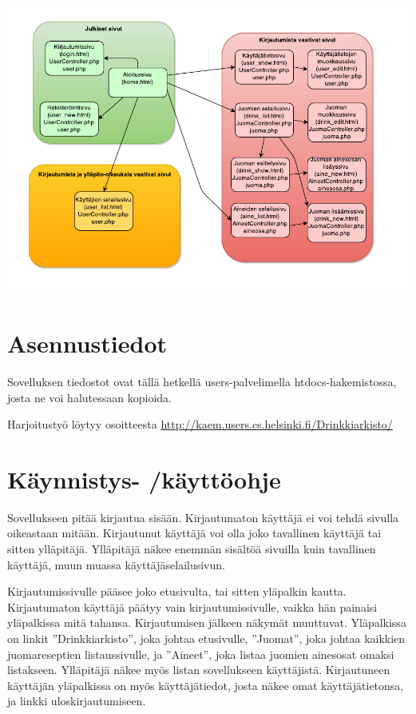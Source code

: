 \documentclass[a4paper]{article}
\begin{document}
\includegraphics[scale=0.8]{sivunakymat.pdf}

\section{Asennustiedot}

Sovelluksen tiedostot ovat tällä hetkellä users-palvelimella htdocs-hakemistossa, josta ne voi halutessaan kopioida.

Harjoitustyö löytyy osoitteesta \url{http://kaem.users.cs.helsinki.fi/Drinkkiarkisto/}


\section{Käynnistys- /käyttöohje}

Sovellukseen pitää kirjautua sisään. Kirjautumaton käyttäjä ei voi tehdä sivulla oikeastaan mitään. Kirjautunut käyttäjä voi olla joko tavallinen käyttäjä tai sitten ylläpitäjä. Ylläpitäjä näkee enemmän sisältöä sivuilla kuin tavallinen käyttäjä, muun muassa käyttäjäselailusivun.

Kirjautumissivulle pääsee joko etusivulta, tai sitten yläpalkin kautta. Kirjautumaton käyttäjä päätyy vain kirjautumissivulle, vaikka hän painaisi yläpalkissa mitä tahansa. Kirjautumisen jälkeen näkymät muuttuvat. Yläpalkissa on linkit ”Drinkkiarkisto”, joka johtaa etusivulle, ”Juomat”, joka johtaa kaikkien juomareseptien listaussivulle, ja ”Aineet”, joka listaa juomien ainesosat omaksi listakseen. Ylläpitäjä näkee myös listan sovellukseen käyttäjistä. Kirjautuneen käyttäjän yläpalkissa on myös käyttäjätiedot, josta näkee omat käyttäjätietonsa, ja linkki uloskirjautumiseen.
\end{document}
